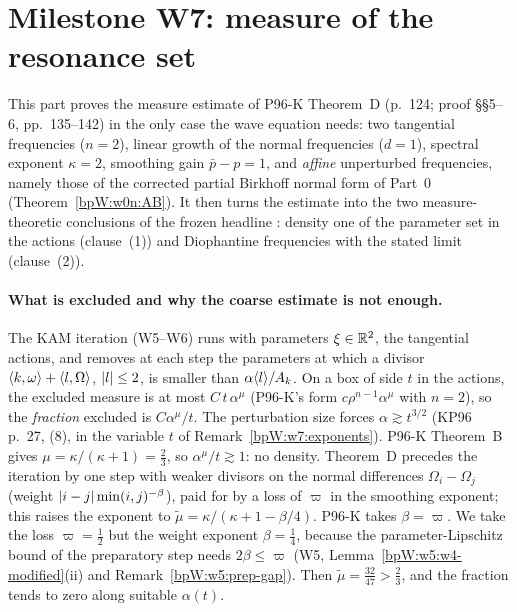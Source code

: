 \section{Milestone W7: measure of the resonance set}\label{bpW:w7}

This part proves the measure estimate of P96-K Theorem~D (p.~124; proof \S\S5--6, pp.~135--142) in the only case
the wave equation needs: two tangential frequencies ($n=2$), linear growth of the normal frequencies ($d=1$),
spectral exponent $\kappa=2$, smoothing gain $\bar p-p=1$, and \emph{affine} unperturbed frequencies, namely those of
the corrected partial Birkhoff normal form of Part~0 (Theorem~\ref{bpW:w0n:AB}). It then turns the estimate into the
two measure-theoretic conclusions of the frozen headline : density one of the parameter set in
the actions (clause~(1)) and Diophantine frequencies with the stated limit (clause~(2)).

\paragraph{What is excluded and why the coarse estimate is not enough.} The KAM iteration (W5--W6) runs with
parameters $\xi\in\mathbb{R}^2$, the tangential actions, and removes at each step the parameters at which a divisor
$\langle k,\omega\rangle+\langle l,\Omega\rangle$, $\lvert l\rvert\le2$, is smaller than $\alpha\langle l\rangle/A_k$. On a box of side $t$ in the
actions, the excluded measure is at most $C\,t\,\alpha^{\mu}$ (P96-K's form $c\rho^{n-1}\alpha^\mu$ with $n=2$), so the
\emph{fraction} excluded is $C\alpha^\mu/t$. The perturbation size forces $\alpha\gtrsim t^{3/2}$ (KP96 p.~27, (8), in
the variable $t$ of Remark~\ref{bpW:w7:exponents}). P96-K Theorem~B gives $\mu=\kappa/(\kappa+1)=\frac23$, so
$\alpha^\mu/t\gtrsim1$: no density. Theorem~D precedes the iteration by one step with weaker divisors on the normal
differences $\Omega_i-\Omega_j$ (weight $\lvert i-j\rvert\min(i,j)^{-\beta}$), paid for by a loss of $\varpi$ in the smoothing
exponent; this raises the exponent to $\tilde\mu=\kappa/(\kappa+1-\beta/4)$. P96-K takes $\beta=\varpi$. We take the
loss $\varpi=\frac12$ but the weight exponent $\beta=\frac14$, because the parameter-Lipschitz bound of the preparatory
step needs $2\beta\le\varpi$ (W5, Lemma~\ref{bpW:w5:w4-modified}(ii) and Remark~\ref{bpW:w5:prep-gap}). Then
$\tilde\mu=\frac{32}{47}>\frac23$, and the fraction tends to zero along suitable $\alpha(t)$.

